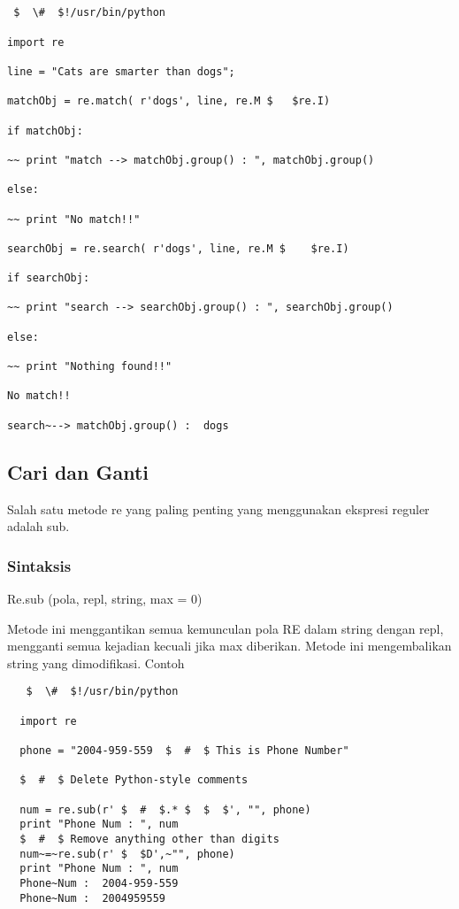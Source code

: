 \begin {enumerate}
\begin {enumerate}
\begin{verbatim}


 $  \#  $!/usr/bin/python

import re

line = "Cats are smarter than dogs";

matchObj = re.match( r'dogs', line, re.M $   $re.I)

if matchObj:

~~ print "match --> matchObj.group() : ", matchObj.group()

else:

~~ print "No match!!"

searchObj = re.search( r'dogs', line, re.M $    $re.I)

if searchObj:

~~ print "search --> searchObj.group() : ", searchObj.group()

else:

~~ print "Nothing found!!"

No match!!

search~--> matchObj.group() :  dogs
\end{verbatim}


\subsection{Cari dan Ganti}
Salah satu metode re yang paling penting yang menggunakan ekspresi reguler adalah sub.

  \subsubsection{Sintaksis}
  Re.sub (pola, repl, string, max = 0)

  Metode ini menggantikan semua kemunculan pola RE dalam string dengan repl, mengganti semua kejadian kecuali jika max diberikan. Metode ini mengembalikan string yang dimodifikasi.
  Contoh
  \begin{verbatim}
   $  \#  $!/usr/bin/python

  import re

  phone = "2004-959-559  $  #  $ This is Phone Number"

  $  #  $ Delete Python-style comments

  num = re.sub(r' $  #  $.* $  $  $', "", phone)
  print "Phone Num : ", num
  $  #  $ Remove anything other than digits
  num~=~re.sub(r' $  $D',~"", phone)
  print "Phone Num : ", num
  Phone~Num :  2004-959-559
  Phone~Num :  2004959559
  \end{verbatim}

\end{enumerate}
\end{enumerate}
